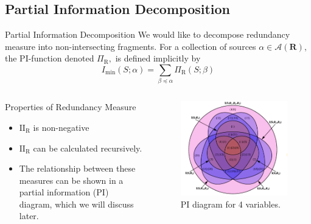 \subsection{Partial Information Decomposition}
\begin{frame}{Partial Information Decomposition}
    We would like to decompose redundancy measure into non-intersecting fragments. For a collection of sources $\alpha \in \mathcal{A}(\mathbf{R}),$ the PI-function denoted $\Pi_{\mathrm{R}},$ is defined implicitly by
    \begin{equation}
    I_{\min }(S ; \alpha)=\sum_{\beta \preccurlyeq \alpha} \Pi_{\mathrm{R}}(S ; \beta)
    \label{eee}
    \end{equation}
    
    \begin{columns}
    \begin{column}{0.5\linewidth}
    \begin{block}{Properties of Redundancy Measure}
    \begin{itemize}
        \item $\mathrm{II}_{\mathrm{R}}$ is non-negative
        \item $\mathrm{II}_{\mathrm{R}}$ can be calculated recursively.
        \item The relationship between these measures can be shown in a partial information (PI) diagram, which we will discuss later.
    \end{itemize}
    \end{block}
    \end{column}
    \begin{column}{0.45\linewidth}
        \begin{figure}
            \centering
            \includegraphics[width=0.8\linewidth]{img/partial4.png}
            \caption{PI diagram for 4 variables.}
            \label{fig:pi4}
        \end{figure}
    \end{column}
    \end{columns}
\end{frame}




